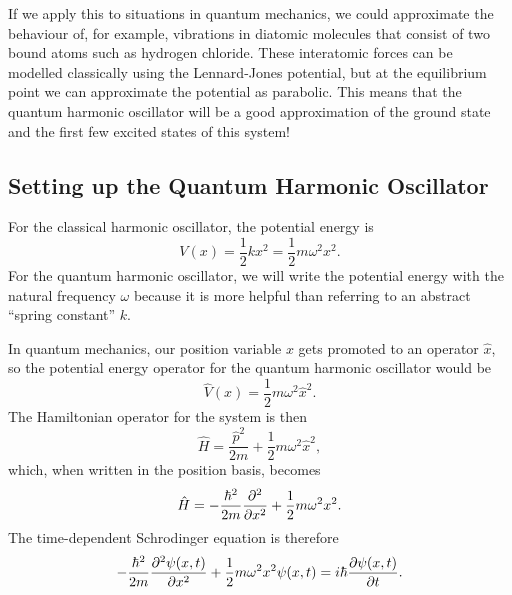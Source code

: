 \documentclass[../quantum_mechanics.tex]{subfiles}
\begin{document}
            If we apply this to situations in quantum mechanics, we could approximate the behaviour of, for example, vibrations in diatomic molecules that consist of two bound atoms such as hydrogen chloride.
            These interatomic forces can be modelled classically using the Lennard-Jones potential, but at the equilibrium point we can approximate the potential as parabolic.
            This means that the quantum harmonic oscillator will be a good approximation of the ground state and the first few excited states of this system!

        \subsection{Setting up the Quantum Harmonic Oscillator}\label{subsec:setting-up-the-quantum-harmonic-oscillator}
            For the classical harmonic oscillator, the potential energy is
            \begin{equation}
                V(x)=\frac{1}{2}kx^2=\frac{1}{2}m\omega^2x^2.
            \end{equation}
            For the quantum harmonic oscillator, we will write the potential energy with the natural frequency $\omega$ because it is more helpful than referring to an abstract ``spring constant'' $k$.
            
            In quantum mechanics, our position variable $x$ gets promoted to an operator $\hat{x}$, so the potential energy operator for the quantum harmonic oscillator would be
            \begin{equation}
                \hat{V}(x)=\frac{1}{2}m\omega^2\hat{x}^2.
            \end{equation}
            The Hamiltonian operator for the system is then
            \begin{equation}\label{eq:qho-hamiltonian}
                \hat{H}=\frac{\hat{p}^2}{2m}+\frac{1}{2}m\omega^2\hat{x}^2,
            \end{equation}
            which, when written in the position basis, becomes
            \begin{equation}
                \hat{H}=-\frac{\hbar^2}{2m}\pdv[2]{}{x}+\frac{1}{2}m\omega^2x^2.
            \end{equation}
            The time-dependent Schrodinger equation is therefore
            \begin{equation}
                -\frac{\hbar^2}{2m}\pdv[2]{\psi(x,t)}{x}+\frac{1}{2}m\omega^2x^2\psi(x,t)=i\hbar\pdv{\psi(x,t)}{t}.
            \end{equation}
            
\end{document}
